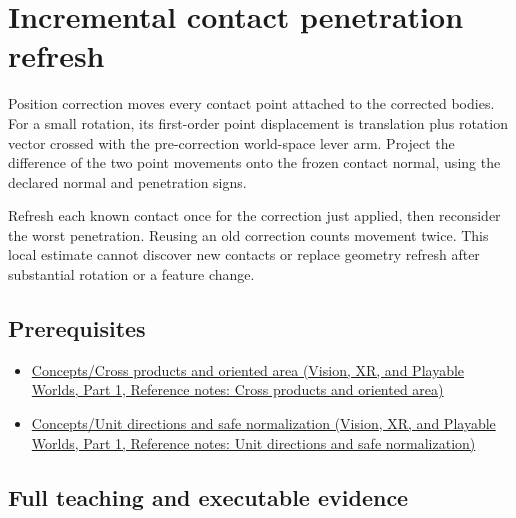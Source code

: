 \hypertarget{appendix-f682275acbdf}{}\label{referencestart:appendix-f682275acbdf}
\section{Incremental contact penetration refresh}\label{appendix-f682275acbdf-incremental-contact-penetration-refresh}

\hypertarget{appendix-f682275acbdf-incremental-contact-penetration-refresh}{}

Position correction moves every contact point attached to the corrected bodies. For a small rotation, its first-order point displacement is translation plus rotation vector crossed with the pre-correction world-space lever arm. Project the difference of the two point movements onto the frozen contact normal, using the declared normal and penetration signs.

Refresh each known contact once for the correction just applied, then reconsider the worst penetration. Reusing an old correction counts movement twice. This local estimate cannot discover new contacts or replace geometry refresh after substantial rotation or a feature change.

\subsection{Prerequisites}\label{appendix-f682275acbdf-prerequisites}

\hypertarget{appendix-f682275acbdf-prerequisites}{}

\begin{itemize}
\tightlist
\item
  \href{../07-Vision-XR-and-Playable-Worlds-P01/main.pdf\#appendix-2391db8052b1}{Concepts/Cross products and oriented area (Vision, XR, and Playable Worlds, Part 1, Reference notes: Cross products and oriented area)}
\item
  \href{../07-Vision-XR-and-Playable-Worlds-P01/main.pdf\#appendix-f744e41b95b4}{Concepts/Unit directions and safe normalization (Vision, XR, and Playable Worlds, Part 1, Reference notes: Unit directions and safe normalization)}
\end{itemize}

\subsection{Full teaching and executable evidence}\label{appendix-f682275acbdf-full-teaching-and-executable-evidence}

